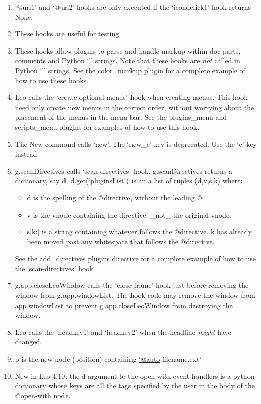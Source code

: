 \documentclass[a4paper,10pt,english]{sphinxmanual}
\begin{document}
\begin{enumerate}
\item {} 
`@url1' and `@url2' hooks are only executed if the `icondclick1' hook returns None.

\item {} 
These hooks are useful for testing.

\item {} 
These hooks allow plugins to parse and handle markup within doc parts,
comments and Python `'' strings. Note that these hooks are \emph{not} called in
Python `'' strings. See the color\_markup plugin for a complete example of how to
use these hooks.

\item {} 
Leo calls the `create-optional-menus' hook when creating menus. This hook need
only create new menus in the correct order, without worrying about the placement
of the menus in the menu bar. See the plugins\_menu and scripts\_menu plugins for
examples of how to use this hook.

\item {} 
The New command calls `new'.
The `new\_c' key is deprecated.  Use the `c' key instead.

\item {} 
g.scanDirectives calls `scan-directives' hook.
g.scanDirectives returns a dictionary, say d.
d.get(`pluginsList') is an a list of tuples (d,v,s,k) where:
\begin{itemize}
\item {} 
d is the spelling of the @directive, without the leading @.

\item {} 
v is the vnode containing the directive, \_not\_ the original vnode.

\item {} 
s{[}k:{]} is a string containing whatever follows the @directive.
k has already been moved past any whitespace that follows the @directive.

\end{itemize}

See the add\_directives plugins directive for a complete example of how to use
the `scan-directives' hook.

\item {} 
g.app.closeLeoWindow calls the `close-frame' hook just before
removing the window from g.app.windowList. The hook code may remove the window
from app.windowList to prevent g.app.closeLeoWindow from destroying the window.

\item {} 
Leo calls the `headkey1' and `headkey2' when the headline \emph{might} have changed.

\item {} 
p is the new node (position) containing \href{mailto:'@auto}{`@auto} filename.ext'

\item {} 
New in Leo 4.10: the d argument to the open-with event handlers is a python
dictionary whose keys are all the tags specified by the user in the body of the
@open-with node.

\end{enumerate}
\end{document}

